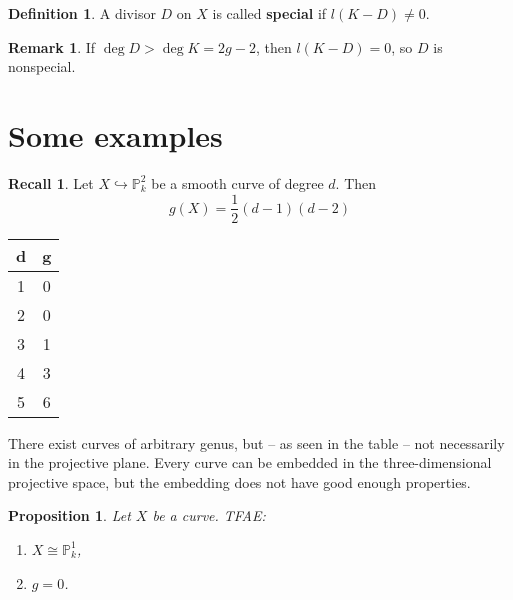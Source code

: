 \documentclass[12pt]{article}
\newtheorem*{proposition}{Proposition}
\theoremstyle{definition}
\newtheorem*{definition}{Definition}
\newtheorem*{remark}{Remark}
\newtheorem*{recall}{Recall}
\begin{document}
\begin{definition}
A divisor $D$ on $X$ is called \textbf{special} if $l(K-D)\neq0$.
\end{definition}

\begin{remark}
If $\deg D>\deg K=2g-2$, then $l(K-D)=0$, so $D$ is nonspecial.
\end{remark}

\section{Some examples}
\begin{recall}
Let $X\hookrightarrow\mathbb{P}_k^2$ be a smooth curve of degree $d$. Then
\begin{equation}\tag{genus formula}
g(X)=\frac{1}{2}(d-1)(d-2)
\end{equation}
\end{recall}

\begin{table}
\centering
\begin{tabular}{c|c}
d&g\\\hline
1&0\\
2&0\\
3&1\\
4&3\\
5&6
\end{tabular}
\end{table}

There exist curves of arbitrary genus, but -- as seen in the table -- not necessarily in the projective plane. Every curve can be embedded in the three-dimensional projective space, but the embedding does not have good enough properties.

\begin{proposition}
Let $X$ be a curve. TFAE:
\begin{enumerate}[label=\arabic*)]
\item\label{genus_line} $X\cong\mathbb{P}_k^1$,
\item\label{g=0} $g=0$.
\end{enumerate}
\end{proposition}
\end{document}
